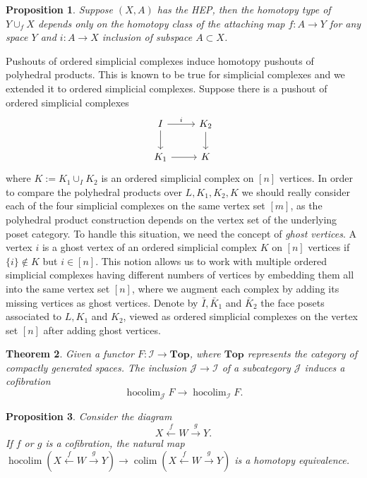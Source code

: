 \documentclass[a4paper,11pt]{article}
\newtheorem{theorem}{Theorem}[section]
\newtheorem{proposition}[theorem]{Proposition}
\theoremstyle{definition}
\DeclareMathOperator*{\hocolim}{hocolim}
\DeclareMathOperator*{\colim}{colim}
\newcommand{\Top}{\textbf{Top}}
\begin{document}
\begin{proposition}\label{hep-conse}\cite[Proposition~0.18]{Hatcher}
	Suppose $(X,A)$ has the HEP, then the homotopy type of $Y\cup_f X$ depends only on the homotopy class of the attaching map $f: A \to Y$ for any space $Y$ and $i:A \to X$ inclusion of subspace $A \subset X$. 
\end{proposition}

Pushouts of ordered simplicial complexes induce homotopy pushouts of polyhedral products.  This is known to be true for simplicial complexes \cite[Proposition~3.8]{toric-homotopy} and we extended it to ordered simplicial complexes. Suppose there is a pushout of ordered simplicial complexes
\[
\begin{tikzcd}
	I \arrow[r, "i"] \arrow[d] & K_2 \arrow[d] \\
	K_1 \arrow[r]  & K 
\end{tikzcd}
\]
where $K := K_1 \cup_I K_2$ is an ordered simplicial complex on $[n]$ vertices. In order to compare the polyhedral products over $L,K_1,K_2,K$ we should really consider each of the four simplicial complexes on the same vertex set $[m]$, as the polyhedral product construction depends on the vertex set of the underlying poset category. To handle this situation, we need the concept of \emph{ghost vertices}. A vertex $i$ is a ghost vertex of an ordered simplicial complex $K$ on $[n]$ vertices if $\{i\}\not\in K$ but $i \in [n]$. This notion allows us to work with multiple ordered simplicial complexes having different numbers of vertices by embedding them all into the same vertex set $[n]$, where we augment each complex by adding its missing vertices as ghost vertices. Denote by $\bar{I},\bar K_1$ and $\bar K_2$ the face posets associated to $L,K_1$ and $K_2$, viewed as ordered simplicial complexes on the vertex set $[n]$ after adding ghost vertices. 


\begin{theorem}\cite[Theorem~8.6.1]{cubical-homotopy}\label{cofibration-homotopy-colimit}
    Given a functor $F: \mathcal{I} \to \Top$, where $\Top$ represents the category of compactly generated spaces. The inclusion $\mathcal{J} \to \mathcal{I}$ of a subcategory $\mathcal{J}$ induces a cofibration 
    \[\hocolim_\mathcal{J} F \to \hocolim_\mathcal{I} F.\]
\end{theorem}


\begin{proposition}\cite[Proposition~3.6.17]{cubical-homotopy}\label{hompushout-pushout}
    Consider the diagram 
    \[
    X \xleftarrow{f} W \xrightarrow{g} Y. 
    \]
    If $f$ or $g$ is a cofibration, the natural map $\hocolim( X \xleftarrow{f} W \xrightarrow{g} Y) \to \colim( X \xleftarrow{f} W \xrightarrow{g} Y)$
    is a homotopy equivalence.  
\end{proposition}
\end{document}
